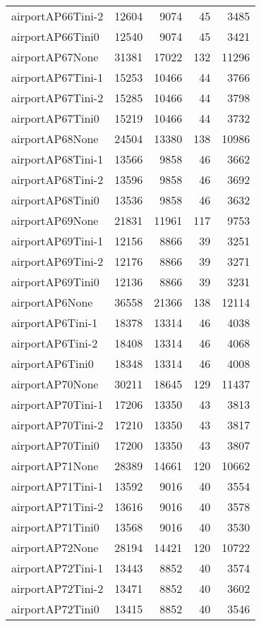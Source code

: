 \begin{longtable}{lrrrr}
airportAP66Tini-2 & 12604 & 9074 & 45 & 3485 \\
airportAP66Tini0 & 12540 & 9074 & 45 & 3421 \\
airportAP67None & 31381 & 17022 & 132 & 11296 \\
airportAP67Tini-1 & 15253 & 10466 & 44 & 3766 \\
airportAP67Tini-2 & 15285 & 10466 & 44 & 3798 \\
airportAP67Tini0 & 15219 & 10466 & 44 & 3732 \\
airportAP68None & 24504 & 13380 & 138 & 10986 \\
airportAP68Tini-1 & 13566 & 9858 & 46 & 3662 \\
airportAP68Tini-2 & 13596 & 9858 & 46 & 3692 \\
airportAP68Tini0 & 13536 & 9858 & 46 & 3632 \\
airportAP69None & 21831 & 11961 & 117 & 9753 \\
airportAP69Tini-1 & 12156 & 8866 & 39 & 3251 \\
airportAP69Tini-2 & 12176 & 8866 & 39 & 3271 \\
airportAP69Tini0 & 12136 & 8866 & 39 & 3231 \\
airportAP6None & 36558 & 21366 & 138 & 12114 \\
airportAP6Tini-1 & 18378 & 13314 & 46 & 4038 \\
airportAP6Tini-2 & 18408 & 13314 & 46 & 4068 \\
airportAP6Tini0 & 18348 & 13314 & 46 & 4008 \\
airportAP70None & 30211 & 18645 & 129 & 11437 \\
airportAP70Tini-1 & 17206 & 13350 & 43 & 3813 \\
airportAP70Tini-2 & 17210 & 13350 & 43 & 3817 \\
airportAP70Tini0 & 17200 & 13350 & 43 & 3807 \\
airportAP71None & 28389 & 14661 & 120 & 10662 \\
airportAP71Tini-1 & 13592 & 9016 & 40 & 3554 \\
airportAP71Tini-2 & 13616 & 9016 & 40 & 3578 \\
airportAP71Tini0 & 13568 & 9016 & 40 & 3530 \\
airportAP72None & 28194 & 14421 & 120 & 10722 \\
airportAP72Tini-1 & 13443 & 8852 & 40 & 3574 \\
airportAP72Tini-2 & 13471 & 8852 & 40 & 3602 \\
airportAP72Tini0 & 13415 & 8852 & 40 & 3546 \\

\end{longtable}
